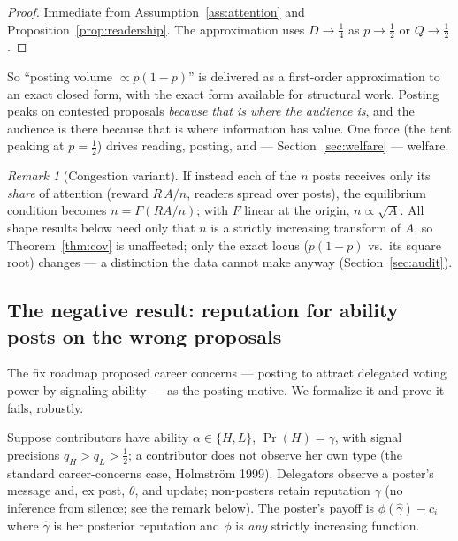\documentclass[11pt]{article}
\theoremstyle{remark}
\newtheorem{remark}{Remark}
\newcommand{\Pro}{\Pr}
\begin{document}
\begin{proof}
Immediate from Assumption~\ref{ass:attention} and
Proposition~\ref{prop:readership}. The approximation uses $D\to\tfrac14$ as
$p\to\tfrac12$ or $Q\to\tfrac12$.
\end{proof}

So ``posting volume $\propto p(1-p)$'' is delivered as a first-order
approximation to an exact closed form, with the exact form available for
structural work. Posting peaks on contested proposals \emph{because that is
where the audience is}, and the audience is there because that is where
information has value. One force (the tent peaking at $p=\tfrac12$) drives
reading, posting, and --- Section~\ref{sec:welfare} --- welfare.

\begin{remark}[Congestion variant]\label{rem:congestion}
If instead each of the $n$ posts receives only its \emph{share} of attention
(reward $R\,A/n$, readers spread over posts), the equilibrium condition becomes
$n=F(RA/n)$; with $F$ linear at the origin, $n\propto\sqrt{A}$. All shape
results below need only that $n$ is a strictly increasing transform of $A$, so
Theorem~\ref{thm:cov} is unaffected; only the exact locus ($p(1-p)$ vs.\ its
square root) changes --- a distinction the data cannot make anyway
(Section~\ref{sec:audit}).
\end{remark}

\subsection{The negative result: reputation for ability posts on the wrong proposals}

The fix roadmap proposed career concerns --- posting to attract delegated voting
power by signaling ability --- as the posting motive. We formalize it and prove
it fails, robustly.

Suppose contributors have ability $\alpha\in\{H,L\}$, $\Pro(H)=\gamma$, with
signal precisions $q_H>q_L>\tfrac12$; a contributor does not observe her own
type (the standard career-concerns case, Holmstr\"om 1999). Delegators observe a
poster's message and, ex post, $\theta$, and update; non-posters retain
reputation $\gamma$ (no inference from silence; see the remark below). The
poster's payoff is $\phi(\hat\gamma)-c_i$ where $\hat\gamma$ is her posterior
reputation and $\phi$ is \emph{any} strictly increasing function.
\end{document}
